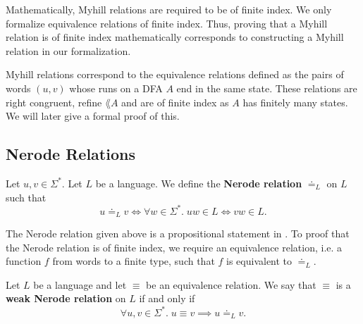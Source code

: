 Mathematically, Myhill relations are required to be of finite index. 
We only formalize equivalence relations of finite index.
Thus, proving that a Myhill relation is of finite index mathematically corresponds 
to constructing a Myhill relation in our formalization.



Myhill relations correspond to the equivalence relations 
defined as the pairs of words $(u, v)$ whose runs on a DFA $A$ end in the same state. 
These relations are right congruent, refine $\lang{A}$ and are of finite index as $A$ has finitely many states. 
We will later give a formal proof of this.

\subsection{Nerode Relations}

\begin{definition}
    \label{suffix_equal}
    Let $u, v \in \Sigma^*$. Let $L$ be a language. We define the \textbf{Nerode relation} $\doteq_L$ on $L$ such that 
    \begin{equation*}
        u \doteq_L v \iff \forall w \in \Sigma^*. \; uw \in L \Leftrightarrow vw \in L. 
    \end{equation*}
\end{definition}


The Nerode relation given above is a propositional statement in \coq. 
To proof that the Nerode relation is of finite index, 
we require an equivalence relation, 
i.e. a function $f$ from words to a finite type,
such that $f$ is equivalent to $\doteq_L$.


\begin{definition}
    \label{Weak_Nerode_Rel}
    Let $L$ be a language and let $\equiv$ be an equivalence relation. We say that $\equiv$ is a \textbf{weak Nerode relation} on $L$ if and only if
    \begin{equation*}
        \forall u, v \in \Sigma^*. \; u \equiv v \implies u \doteq_L v.
    \end{equation*}
\end{definition}




